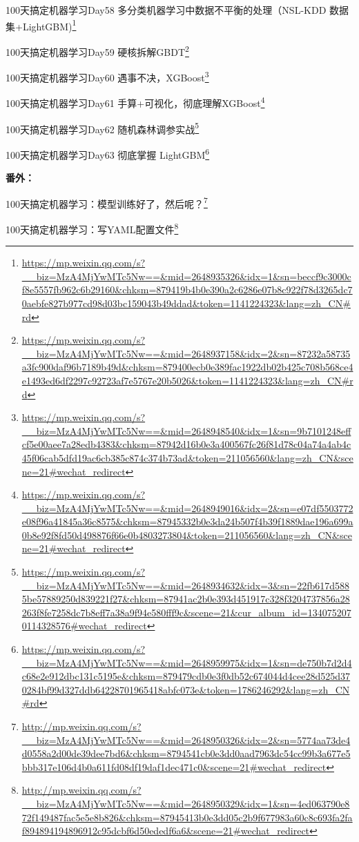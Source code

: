 \documentclass[]{ctexbook}
\renewcommand{\href}[2]{#2\footnote{\url{#1}}}
\begin{document}
\href{https://mp.weixin.qq.com/s?__biz=MzA4MjYwMTc5Nw==\&mid=2648935326\&idx=1\&sn=beccf9c3000cf8e5557fb962c6b29160\&chksm=879419b4b0e390a2c6286e07b8c922f78d3265dc70aebfe827b977cd98d03bc159043b49ddad\&token=1141224323\&lang=zh_CN\#rd}{100天搞定机器学习\textbar{}Day58 多分类机器学习中数据不平衡的处理（NSL-KDD 数据集+LightGBM)}

\href{https://mp.weixin.qq.com/s?__biz=MzA4MjYwMTc5Nw==\&mid=2648937158\&idx=2\&sn=87232a58735a3fc900daf96b7189b49d\&chksm=879400ecb0e389fac1922db02b425c708b568ce4e1493ed6df2297c92723af7e5767e20b5026\&token=1141224323\&lang=zh_CN\#rd}{100天搞定机器学习\textbar{}Day59 硬核拆解GBDT}

\href{https://mp.weixin.qq.com/s?__biz=MzA4MjYwMTc5Nw==\&mid=2648948540\&idx=1\&sn=9b7101248effcf5e00aee7a28edb4383\&chksm=87942d16b0e3a400567fc26f81d78c04a74a4ab4c45f06cab5dfd19ac6cb385c874c374b73ad\&token=211056560\&lang=zh_CN\&scene=21\#wechat_redirect}{100天搞定机器学习\textbar{}Day60 遇事不决，XGBoost}

\href{https://mp.weixin.qq.com/s?__biz=MzA4MjYwMTc5Nw==\&mid=2648949016\&idx=2\&sn=e07df5503772e08f96a41845a36c8575\&chksm=87945332b0e3da24b507f4b39f1889dae196a699a0b8e92f8fd50d498876f66e0b4803273804\&token=211056560\&lang=zh_CN\&scene=21\#wechat_redirect}{100天搞定机器学习\textbar{}Day61 手算+可视化，彻底理解XGBoost}

\href{https://mp.weixin.qq.com/s?__biz=MzA4MjYwMTc5Nw==\&mid=2648934632\&idx=3\&sn=22fb617d5885be57889250d839221f27\&chksm=87941ac2b0e393d451917c328f3204737856a28263f8fe7258dc7b8eff7a38a9f94e580fff9c\&scene=21\&cur_album_id=1340752070114328576\#wechat_redirect}{100天搞定机器学习\textbar{}Day62 随机森林调参实战}

\href{https://mp.weixin.qq.com/s?__biz=MzA4MjYwMTc5Nw==\&mid=2648959975\&idx=1\&sn=de750b7d2d4c68e2e912dbc131c5195e\&chksm=879479cdb0e3f0db52c674044d4cee28d525d370284bf99d327ddb64228701965418abfc073e\&token=1786246292\&lang=zh_CN\#rd}{​100天搞定机器学习\textbar{}Day63 彻底掌握 LightGBM}

\textbf{番外：}

\href{http://mp.weixin.qq.com/s?__biz=MzA4MjYwMTc5Nw==\&mid=2648950326\&idx=2\&sn=5774aa73de4d0558a2d00de39dee7bd6\&chksm=8794541cb0e3dd0aad7963dc54cc99b3a677e5bbb317e106d4b0a611fd08df19daf1dec471c0\&scene=21\#wechat_redirect}{100天搞定机器学习：模型训练好了，然后呢？}

\href{http://mp.weixin.qq.com/s?__biz=MzA4MjYwMTc5Nw==\&mid=2648950329\&idx=1\&sn=4ed063790e872f149487fac5e5e8b826\&chksm=87945413b0e3dd05c2b9f677983a60c8c693fa2faf894894194896912c95dcbf6d50ededf6a6\&scene=21\#wechat_redirect}{100天搞定机器学习：写YAML配置文件}
\end{document}
